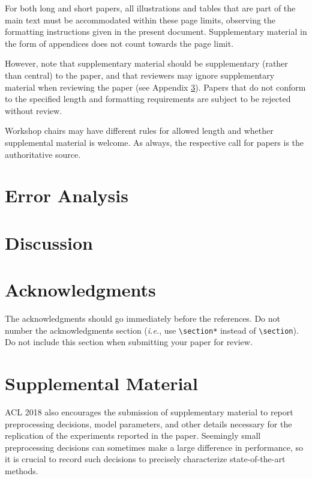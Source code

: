 \documentclass[11pt,a4paper]{article}
\begin{document}
For both long and short papers, all illustrations and tables that are part
of the main text must be accommodated within these page limits, observing
the formatting instructions given in the present document. Supplementary
material in the form of appendices does not count towards the page limit.

However, note that supplementary material should be supplementary
(rather than central) to the paper, and that reviewers may ignore
supplementary material when reviewing the paper (see Appendix
\ref{sec:supplemental}). Papers that do not conform to the specified
length and formatting requirements are subject to be rejected without
review.

Workshop chairs may have different rules for allowed length and
whether supplemental material is welcome. As always, the respective
call for papers is the authoritative source.
\section{Error Analysis}
\section{Discussion}
\section*{Acknowledgments}

The acknowledgments should go immediately before the references.  Do not number the acknowledgments section ({\em i.e.}, use \verb|\section*| instead of \verb|\section|). Do not include this section when submitting your paper for review.

%
%



\appendix

\section{Supplemental Material}
\label{sec:supplemental}
ACL 2018 also encourages the submission of supplementary material
to report preprocessing decisions, model parameters, and other details
necessary for the replication of the experiments reported in the 
paper. Seemingly small preprocessing decisions can sometimes make
a large difference in performance, so it is crucial to record such
decisions to precisely characterize state-of-the-art methods.
\end{document}
